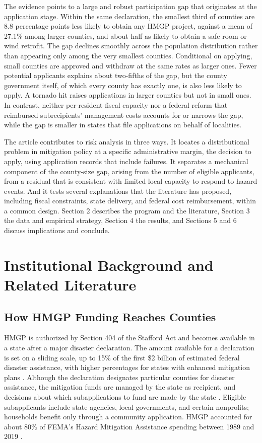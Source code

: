 \documentclass[12pt]{article}
\begin{document}
The evidence points to a large and robust participation gap that originates at the application stage. Within the same declaration, the smallest third of counties are 8.8 percentage points less likely to obtain any HMGP project, against a mean of 27.1\% among larger counties, and about half as likely to obtain a safe room or wind retrofit. The gap declines smoothly across the population distribution rather than appearing only among the very smallest counties. Conditional on applying, small counties are approved and withdraw at the same rates as larger ones. Fewer potential applicants explains about two-fifths of the gap, but the county government itself, of which every county has exactly one, is also less likely to apply. A tornado hit raises applications in larger counties but not in small ones. In contrast, neither per-resident fiscal capacity nor a federal reform that reimbursed subrecipients' management costs accounts for or narrows the gap, while the gap is smaller in states that file applications on behalf of localities.

The article contributes to risk analysis in three ways. It locates a distributional problem in mitigation policy at a specific administrative margin, the decision to apply, using application records that include failures. It separates a mechanical component of the county-size gap, arising from the number of eligible applicants, from a residual that is consistent with limited local capacity to respond to hazard events. And it tests several explanations that the literature has proposed, including fiscal constraints, state delivery, and federal cost reimbursement, within a common design. Section 2 describes the program and the literature, Section 3 the data and empirical strategy, Section 4 the results, and Sections 5 and 6 discuss implications and conclude.

\section{Institutional Background and Related Literature}

\subsection{How HMGP Funding Reaches Counties}

HMGP is authorized by Section 404 of the Stafford Act and becomes available in a state after a major disaster declaration. The amount available for a declaration is set on a sliding scale, up to 15\% of the first \$2 billion of estimated federal disaster assistance, with higher percentages for states with enhanced mitigation plans \parencite{horn2022crs}. Although the declaration designates particular counties for disaster assistance, the mitigation funds are managed by the state as recipient, and decisions about which subapplications to fund are made by the state \parencite{horn2022crs}. Eligible subapplicants include state agencies, local governments, and certain nonprofits; households benefit only through a community application. HMGP accounted for about 80\% of FEMA's Hazard Mitigation Assistance spending between 1989 and 2019 \parencite{frimpong2023federal}.
\end{document}
